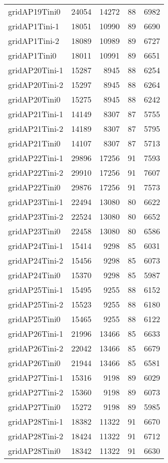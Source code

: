 \begin{longtable}{lrrrr}
gridAP19Tini0 & 24054 & 14272 & 88 & 6982 \\
gridAP1Tini-1 & 18051 & 10990 & 89 & 6690 \\
gridAP1Tini-2 & 18089 & 10989 & 89 & 6727 \\
gridAP1Tini0 & 18011 & 10991 & 89 & 6651 \\
gridAP20Tini-1 & 15287 & 8945 & 88 & 6254 \\
gridAP20Tini-2 & 15297 & 8945 & 88 & 6264 \\
gridAP20Tini0 & 15275 & 8945 & 88 & 6242 \\
gridAP21Tini-1 & 14149 & 8307 & 87 & 5755 \\
gridAP21Tini-2 & 14189 & 8307 & 87 & 5795 \\
gridAP21Tini0 & 14107 & 8307 & 87 & 5713 \\
gridAP22Tini-1 & 29896 & 17256 & 91 & 7593 \\
gridAP22Tini-2 & 29910 & 17256 & 91 & 7607 \\
gridAP22Tini0 & 29876 & 17256 & 91 & 7573 \\
gridAP23Tini-1 & 22494 & 13080 & 80 & 6622 \\
gridAP23Tini-2 & 22524 & 13080 & 80 & 6652 \\
gridAP23Tini0 & 22458 & 13080 & 80 & 6586 \\
gridAP24Tini-1 & 15414 & 9298 & 85 & 6031 \\
gridAP24Tini-2 & 15456 & 9298 & 85 & 6073 \\
gridAP24Tini0 & 15370 & 9298 & 85 & 5987 \\
gridAP25Tini-1 & 15495 & 9255 & 88 & 6152 \\
gridAP25Tini-2 & 15523 & 9255 & 88 & 6180 \\
gridAP25Tini0 & 15465 & 9255 & 88 & 6122 \\
gridAP26Tini-1 & 21996 & 13466 & 85 & 6633 \\
gridAP26Tini-2 & 22042 & 13466 & 85 & 6679 \\
gridAP26Tini0 & 21944 & 13466 & 85 & 6581 \\
gridAP27Tini-1 & 15316 & 9198 & 89 & 6029 \\
gridAP27Tini-2 & 15360 & 9198 & 89 & 6073 \\
gridAP27Tini0 & 15272 & 9198 & 89 & 5985 \\
gridAP28Tini-1 & 18382 & 11322 & 91 & 6670 \\
gridAP28Tini-2 & 18424 & 11322 & 91 & 6712 \\
gridAP28Tini0 & 18342 & 11322 & 91 & 6630 \\

\end{longtable}
